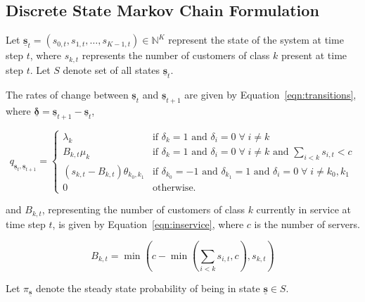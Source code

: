 \documentclass{article}
\begin{document}
\subsection{Discrete State Markov Chain Formulation}\label{sec:state_formulation}
Let
$\underline{\mathbf{s}}_t = (s_{0,t}, s_{1,t}, \dots, s_{K-1,t}) \in \mathbb{N}^K$
represent the state of the system at time step $t$, where $s_{k,t}$ represents
the number of customers of class $k$ present at time step $t$. Let $S$ denote
set of all states $\underline{\mathbf{s}}_t$. 

The rates of change between $\underline{\mathbf{s}}_t$ and
$\underline{\mathbf{s}}_{t+1}$ are given by Equation~\ref{eqn:transitions},
where $\underline{\mathbf{\delta}} = \underline{\mathbf{s}}_{t+1} - \underline{\mathbf{s}}_t$,

\begin{equation}\label{eqn:transitions}
q_{\underline{\mathbf{s}}_t, \underline{\mathbf{s}}_{t+1}} = 
\begin{cases}
\lambda_k & \text{if } \delta_k = 1 \text{ and } \delta_i = 0 \; \forall \; i \neq k \\
B_{k,t} \mu_k & \text{if } \delta_k = 1 \text{ and } \delta_i = 0 \; \forall \; i \neq k \text{ and } \sum_{i < k} s_{i,t} < c \\
(s_{k,t} - B_{k,t}) \theta_{k_0,k_1} & \text{if } \delta_{k_0} = -1 \text{ and } \delta_{k_1} = 1 \text{ and } \delta_i = 0 \; \forall \; i \neq k_0, k_1 \\
0 & \text{otherwise.}
\end{cases}
\end{equation}

and $B_{k,t}$, representing the number of customers of class $k$ currently in
service at time step $t$, is given by Equation~\ref{eqn:inservice}, where $c$
is the number of servers.

\begin{equation}\label{eqn:inservice}
B_{k,t} =\min\left(c - \min\left(\sum_{i < k} s_{i,t}, c\right), s_{k,t}\right)
\end{equation}

Let $\pi_{\underline{\mathbf{s}}}$ denote the steady state probability of being
in state $\underline{\mathbf{s}} \in S$.
\end{document}
